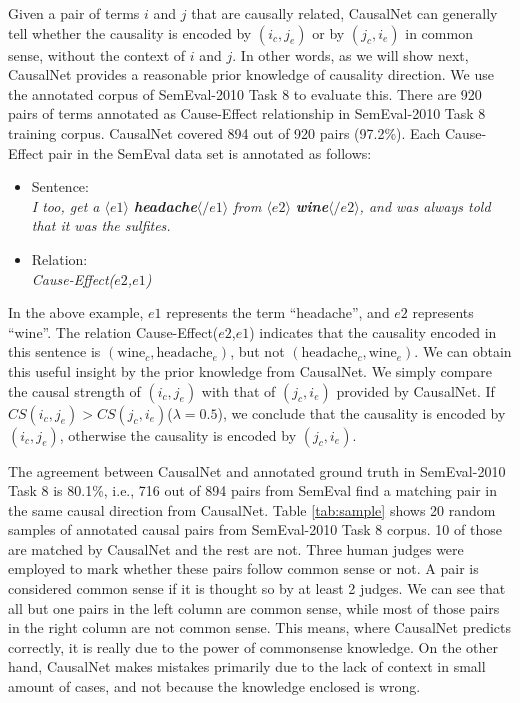 \documentclass[letterpaper]{article}
\newcommand{\tabref}[1]{Table \ref{#1}}
\begin{document}
Given a pair of terms $i$ and $j$ that are causally related,
CausalNet can generally tell whether the causality is encoded by $(i_c,j_e)$
or by $(j_c,i_e)$ in common sense, without the context of
$i$ and $j$. In other words, as we will show next, CausalNet
provides a reasonable prior knowledge of causality direction.
We use the annotated corpus of SemEval-2010 Task 8 to evaluate this.
There are 920 pairs of terms annotated as Cause-Effect relationship in
SemEval-2010 Task 8 training corpus. CausalNet covered 894 out of
920 pairs (97.2\%).
Each Cause-Effect pair in the SemEval data set is annotated as follows:
\begin{itemize}
  \item[] Sentence:\\
  {\em I too, get a $\langle e1\rangle$ \textbf{headache}$\langle/e1\rangle$
  from $\langle e2\rangle$ \textbf{wine}$\langle/e2\rangle$, and was always told that it was the sulfites.}
  \item[] Relation: \\ \emph{Cause-Effect($e2$,$e1$)}
\end{itemize}
In the above example, $e1$ represents the term ``headache'', and
$e2$ represents ``wine''. The relation Cause-Effect($e2$,$e1$)
indicates that the causality encoded in this sentence is
$(\text{wine}_c,\text{headache}_e)$,
but not
$(\text{headache}_c,\text{wine}_e)$.
We can obtain this useful
insight by the prior knowledge from CausalNet.
We simply compare the causal strength of
$(i_c,j_e)$ with that of $(j_c,i_e)$ provided by
CausalNet. If $CS(i_c,j_e) > CS(j_c,i_e)$($\lambda=0.5$), we
conclude that the causality is encoded by $(i_c,j_e)$,
otherwise the causality is encoded by $(j_c,i_e)$.

The agreement between CausalNet and annotated ground truth in SemEval-2010
Task 8 is 80.1\%, i.e., 716 out of 894 pairs from SemEval find
a matching pair in the same causal direction from CausalNet.
\tabref{tab:sample} shows 20 random samples of annotated causal pairs
from SemEval-2010 Task 8 corpus. 10 of those are matched by
CausalNet and the rest are not. Three human judges were employed to
mark whether these pairs follow common sense or not. A pair
is considered common sense if it is thought so by at least 2 judges.
We can see that all but one pairs in the left column are common sense,
while most of those pairs in the right column are not common sense.
This means, where CausalNet predicts correctly, it is really due to the power
of commonsense knowledge. On the other hand, CausalNet makes mistakes primarily
due to the lack of context in small amount of cases, and not because the
knowledge enclosed is wrong.
\end{document}
